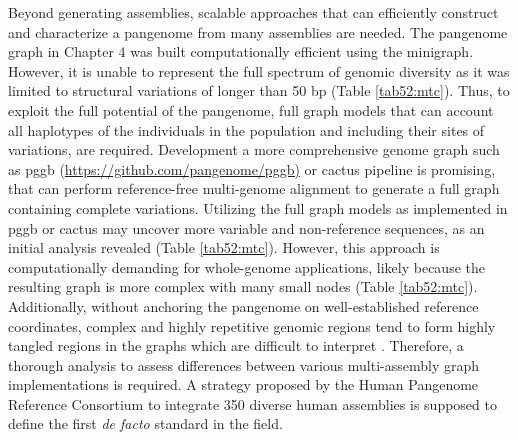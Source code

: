 \documentclass[../main.tex]{subfiles}
\begin{document}
Beyond generating assemblies, scalable approaches that can efficiently construct and characterize a pangenome from many assemblies are needed. The pangenome graph in Chapter 4 was built computationally efficient using the minigraph. However, it is unable to represent the full spectrum of genomic diversity as it was limited to structural variations of longer than 50 bp (Table \ref{tab52:mtc}). Thus, to exploit the full potential of the pangenome, full graph models that can account all haplotypes of the individuals in the population and including their sites of variations, are required. Development a more comprehensive genome graph such as pggb (\url{https://github.com/pangenome/pggb)} or cactus \citep{armstrong2020progressive} pipeline is promising, that can perform reference-free multi-genome alignment to generate a full graph containing complete variations. Utilizing the full graph models as implemented in pggb or cactus may uncover more variable and non-reference sequences, as an initial analysis revealed (Table \ref{tab52:mtc}). However, this approach is computationally demanding for whole-genome applications, likely because the resulting graph is more complex with many small nodes (Table \ref{tab52:mtc}). Additionally, without anchoring the pangenome on well-established reference coordinates, complex and highly repetitive genomic regions tend to form highly tangled regions in the graphs which are difficult to interpret \citep{lei2021plant}. Therefore, a thorough analysis to assess differences between various multi-assembly graph implementations is required. A strategy proposed by the Human Pangenome Reference Consortium to integrate 350 diverse human assemblies is supposed to define the first \emph{de facto} standard in the field. 
\end{document}

